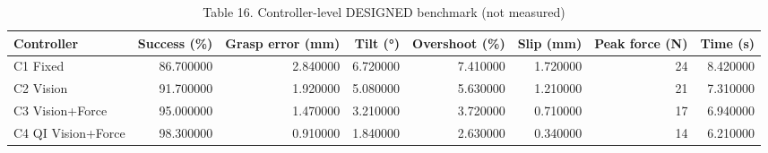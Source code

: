 \begin{table}
\caption{Table 16. Controller-level DESIGNED benchmark (not measured)}
\label{tab:table16}
\begin{tabular}{lrrrrrrr}
\toprule
Controller & Success (\%) & Grasp error (mm) & Tilt (°) & Overshoot (\%) & Slip (mm) & Peak force (N) & Time (s) \\
\midrule
C1 Fixed & 86.700000 & 2.840000 & 6.720000 & 7.410000 & 1.720000 & 24 & 8.420000 \\
C2 Vision & 91.700000 & 1.920000 & 5.080000 & 5.630000 & 1.210000 & 21 & 7.310000 \\
C3 Vision+Force & 95.000000 & 1.470000 & 3.210000 & 3.720000 & 0.710000 & 17 & 6.940000 \\
C4 QI Vision+Force & 98.300000 & 0.910000 & 1.840000 & 2.630000 & 0.340000 & 14 & 6.210000 \\
\bottomrule
\end{tabular}
\end{table}
